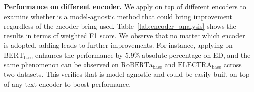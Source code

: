 
\noindent\textbf{Performance on different encoder.}
We apply \wsmodelname on top of different encoders to examine whether \wsmodelname is a model-agnostic method that could bring improvement regardless of the encoder being used. 
Table~\ref{tab:encoder_analysis} shows the results in terms of weighted F1 score. We observe that no matter which encoder is adopted, adding \wsmodelname leads to further improvements. For instance, applying \wsmodelname on $\mathrm{BERT}_\mathrm{base}$ enhances the performance by 5.9\% absolute percentage on ED, and the same phenomenon can be observed on $\mathrm{RoBERTa}_\mathrm{base}$ and $\mathrm{ELECTRA}_\mathrm{base}$ across two datasets. This verifies that \wsmodelname is model-agnostic and could be easily built on top of any text encoder to boost performance.


